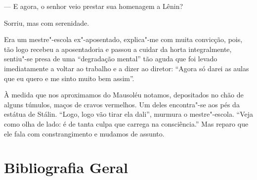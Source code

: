 --- E agora, o senhor veio prestar sua homenagem a Lênin?

Sorriu, mas com serenidade.

Era um mestre"-escola ex"-aposentado, explica"-me com muita convicção, pois, tão logo recebeu a aposentadoria e passou a cuidar da horta integralmente, sentiu"-se presa de uma ``degradação mental'' tão aguda que foi levado imediatamente a voltar ao trabalho e a dizer ao diretor: ``Agora só darei as aulas que eu quero e me sinto muito bem assim''.

À medida que nos aproximamos do Mausoléu notamos, depositados no chão de alguns túmulos, maços de cravos vermelhos. Um deles encontra"-se aos pés da estátua de Stálin. ``Logo, logo vão tirar ela dali'', murmura o mestre"-escola. ``Veja como olha de lado: é de tanta culpa que carrega na consciência.'' Mas reparo que ele fala com constrangimento e mudamos de assunto.
\afterpage{\blankpage}
\pagebreak


\section{\MakeUppercase{B}ibliografia \MakeUppercase{G}eral}
\label{bibliografia}

